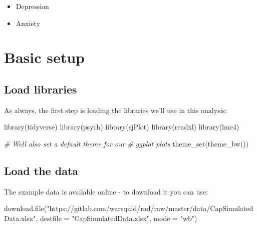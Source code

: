 \documentclass[
]{book}
\newenvironment{Shaded}{\begin{snugshade}}{\end{snugshade}}
\newcommand{\AttributeTok}[1]{\textcolor[rgb]{0.77,0.63,0.00}{#1}}
\newcommand{\CommentTok}[1]{\textcolor[rgb]{0.56,0.35,0.01}{\textit{#1}}}
\newcommand{\FunctionTok}[1]{\textcolor[rgb]{0.00,0.00,0.00}{#1}}
\newcommand{\NormalTok}[1]{#1}
\newcommand{\StringTok}[1]{\textcolor[rgb]{0.31,0.60,0.02}{#1}}
\providecommand{\tightlist}{%
  \setlength{\itemsep}{0pt}\setlength{\parskip}{0pt}}
\begin{document}
\begin{itemize}
\tightlist
\item
  Depression
\item
  Anxiety
\end{itemize}

\hypertarget{basic-setup}{%
\section{Basic setup}\label{basic-setup}}

\hypertarget{load-libraries}{%
\subsection{Load libraries}\label{load-libraries}}

As always, the first step is loading the libraries we'll use in this
analysis:

\begin{Shaded}
\begin{Highlighting}[]
\FunctionTok{library}\NormalTok{(tidyverse)}
\FunctionTok{library}\NormalTok{(psych)}
\FunctionTok{library}\NormalTok{(sjPlot)}
\FunctionTok{library}\NormalTok{(readxl)}
\FunctionTok{library}\NormalTok{(lme4)}

\CommentTok{\# We\textquotesingle{}ll also set a default theme for our}
\CommentTok{\#   ggplot plots}
\FunctionTok{theme\_set}\NormalTok{(}\FunctionTok{theme\_bw}\NormalTok{())}
\end{Highlighting}
\end{Shaded}

\hypertarget{load-the-data}{%
\subsection{Load the data}\label{load-the-data}}

The example data is available online - to download it you can use:

\begin{Shaded}
\begin{Highlighting}[]
\FunctionTok{download.file}\NormalTok{(}\StringTok{"https://gitlab.com/warsquid/rad/raw/master/data/CapSimulatedData.xlsx"}\NormalTok{,}
              \AttributeTok{destfile =} \StringTok{"CapSimulatedData.xlsx"}\NormalTok{,}
              \AttributeTok{mode =} \StringTok{"wb"}\NormalTok{)}
\end{Highlighting}
\end{Shaded}
\end{document}

